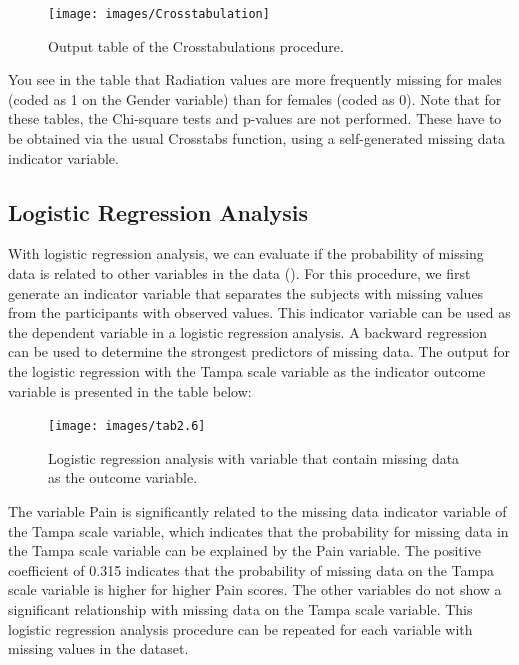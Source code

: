 \documentclass[
]{book}
\begin{document}
\begin{figure}

{\centering \texttt{[image: images/Crosstabulation]} 

}

\caption{Output table of the Crosstabulations procedure.}\label{fig:tab2-8}
\end{figure}

You see in the table that Radiation values are more frequently missing for males (coded as 1 on the Gender variable) than for females (coded as 0). Note that for these tables, the Chi-square tests and p-values are not performed. These have to be obtained via the usual Crosstabs function, using a self-generated missing data indicator variable.

\hypertarget{logistic-regression-analysis}{%
\subsection{Logistic Regression Analysis}\label{logistic-regression-analysis}}

With logistic regression analysis, we can evaluate if the probability of missing data is related to other variables in the data (\citet{Ridout1991}). For this procedure, we first generate an indicator variable that separates the subjects with missing values from the participants with observed values. This indicator variable can be used as the dependent variable in a logistic regression analysis. A backward regression can be used to determine the strongest predictors of missing data. The output for the logistic regression with the Tampa scale variable as the indicator outcome variable is presented in the table below:

\begin{figure}

{\centering \texttt{[image: images/tab2.6]} 

}

\caption{Logistic regression analysis with variable that contain missing data as the outcome variable.}\label{fig:tab2-6}
\end{figure}

The variable Pain is significantly related to the missing data indicator variable of the Tampa scale variable, which indicates that the probability for missing data in the Tampa scale variable can be explained by the Pain variable. The positive coefficient of 0.315 indicates that the probability of missing data on the Tampa scale variable is higher for higher Pain scores. The other variables do not show a significant relationship with missing data on the Tampa scale variable. This logistic regression analysis procedure can be repeated for each variable with missing values in the dataset.
\end{document}
